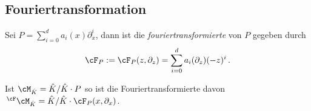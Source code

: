 \subsection{Fouriertransformation}
\begin{defn}[Fouriertransformation]
Sei $P=\sum_{i=0}^da_i(x)\partial_x^i$, dann ist die
\emph{fouriertransformierte} von
$P$ gegeben durch
\[
\cF_P:=\cF_P(z,\partial_z)=\sum_{i=0}^da_i(\partial_z)(-z)^i \,.
\]
\begin{comment}
\cite[Def 3.1]{Bloch_localfourier}
\cite{GarciaLopez04}
\cite[Def 6.1]{ZulaBarbara}
\end{comment}
\end{defn}
\begin{defn}
Ist $\cM_{\hat K}=\hat K / \hat K \cdot P$ so ist die Fouriertransformierte
davon $\,^\cF\cM_{\hat K}=\hat K / \hat K \cdot \cF_P(x,\partial_x)$.
\end{defn}
